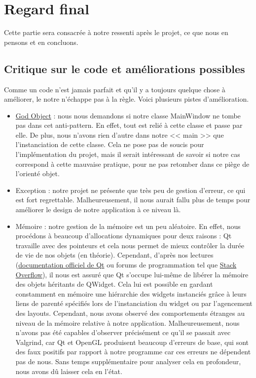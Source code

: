 \documentclass[11pt]{article}
\begin{document}
\section{Regard final}

Cette partie sera consacrée à notre ressenti après le projet, ce que nous en
pensons et en concluons.

\subsection{Critique sur le code et améliorations possibles}

Comme un code n'est jamais parfait et qu'il y a toujours quelque chose à
améliorer, le notre n'échappe pas à la règle. Voici plusieurs pistes
d'amélioration.
\begin{itemize}
    \item \href{https://fr.wikipedia.org/wiki/God_object}{God Object} : nous
        nous demandons si notre classe MainWindow ne tombe pas dans cet
        anti-pattern. En effet, tout est relié à cette classe et passe par elle.
        De plus, nous n'avons rien d'autre dans notre << main >> que
        l'instanciation de cette classe. Cela ne pose pas de soucis pour
        l'implémentation du projet, mais il serait intéressant de savoir si
        notre cas correspond à cette mauvaise pratique, pour ne pas retomber
        dans ce piège de l'orienté objet.
    \item Exception : notre projet ne présente que très peu de gestion d'erreur,
        ce qui est fort regrettable. Malheureusement, il nous aurait fallu plus
        de temps pour améliorer le design de notre application à ce niveau là.
    \item Mémoire : notre gestion de la mémoire est un peu aléatoire. En effet,
        nous procédons à beaucoup d'allocations dynamiques pour deux raisons :
        Qt travaille avec des pointeurs et cela nous permet de mieux contrôler
        la durée de vie de nos objets (en théorie). Cependant, d'après nos
        lectures (\href{https://doc.qt.io/}{documentation officiel de Qt} ou
        forums de programmation tel que \href{https://stackoverflow.com/}{Stack
        Overflow}), il nous est assuré que Qt s'occupe lui-même de libérer la
        mémoire des objets héritants de QWidget. Cela lui est possible en
        gardant constamment en mémoire une hiérarchie des widgets instanciés
        grâce à leurs liens de parenté spécifiés lors de l'instanciation du
        widget ou par l'agencement des layouts. Cependant, nous avons observé
        des comportements étranges au niveau de la mémoire relative à notre
        application. Malheureusement, nous n'avons pas été capables d'observer
        précisément ce qu'il se passait avec Valgrind, car Qt et OpenGL
        produisent beaucoup d'erreurs de base, qui sont des faux positifs par
        rapport à notre programme car ces erreurs ne dépendent pas de nous. Sans
        temps supplémentaire pour analyser cela en profondeur, nous avons dû
        laisser cela en l'état.
\end{itemize}
\end{document}
